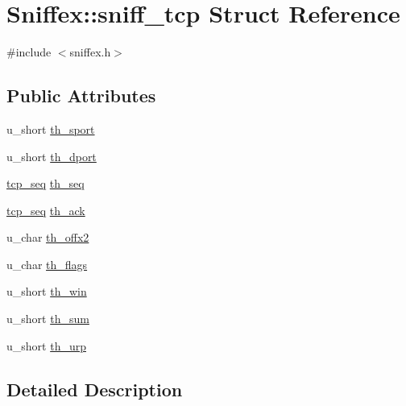 \hypertarget{struct_sniffex_1_1sniff__tcp}{}\section{Sniffex\+:\+:sniff\+\_\+tcp Struct Reference}
\label{struct_sniffex_1_1sniff__tcp}


{\ttfamily \#include $<$sniffex.\+h$>$}

\subsection*{Public Attributes}
\begin{DoxyCompactItemize}
\item 
u\+\_\+short \mbox{\hyperlink{struct_sniffex_1_1sniff__tcp_a3cbc5a34aaffbb66d2e37060bd2ea9b6}{th\+\_\+sport}}
\item 
u\+\_\+short \mbox{\hyperlink{struct_sniffex_1_1sniff__tcp_a98f86dbef1d01db2bd032e1fe99342eb}{th\+\_\+dport}}
\item 
\mbox{\hyperlink{class_sniffex_a83629f6a3ec687dd2bb381e9bf157d4f}{tcp\+\_\+seq}} \mbox{\hyperlink{struct_sniffex_1_1sniff__tcp_a7adabab3aaed105f0e075d3ce9ad523d}{th\+\_\+seq}}
\item 
\mbox{\hyperlink{class_sniffex_a83629f6a3ec687dd2bb381e9bf157d4f}{tcp\+\_\+seq}} \mbox{\hyperlink{struct_sniffex_1_1sniff__tcp_a3c946baf5941e2e12af8b56a2570eece}{th\+\_\+ack}}
\item 
u\+\_\+char \mbox{\hyperlink{struct_sniffex_1_1sniff__tcp_a27045544602ef965e5a50025f42fbd1d}{th\+\_\+offx2}}
\item 
u\+\_\+char \mbox{\hyperlink{struct_sniffex_1_1sniff__tcp_a2bef60aa797ee914836f6b0007dc3ebb}{th\+\_\+flags}}
\item 
u\+\_\+short \mbox{\hyperlink{struct_sniffex_1_1sniff__tcp_aa8b7d8b1967e81a255ec9362f681c721}{th\+\_\+win}}
\item 
u\+\_\+short \mbox{\hyperlink{struct_sniffex_1_1sniff__tcp_a69830e35f22fcd1b9051afbd4e633fc0}{th\+\_\+sum}}
\item 
u\+\_\+short \mbox{\hyperlink{struct_sniffex_1_1sniff__tcp_a9f030cb6718b8d828f242d0464560761}{th\+\_\+urp}}
\end{DoxyCompactItemize}


\subsection{Detailed Description}


